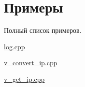 \section{Примеры}
Полный список примеров.\begin{DoxyCompactItemize}
\item 
\hyperlink{log_8cpp-example}{log.\+cpp}
\item 
\hyperlink{v_convert_ip_8cpp-example}{v\+\_\+convert\+\_\+ip.\+cpp}
\item 
\hyperlink{v_get_ip_8cpp-example}{v\+\_\+get\+\_\+ip.\+cpp}
\end{DoxyCompactItemize}
